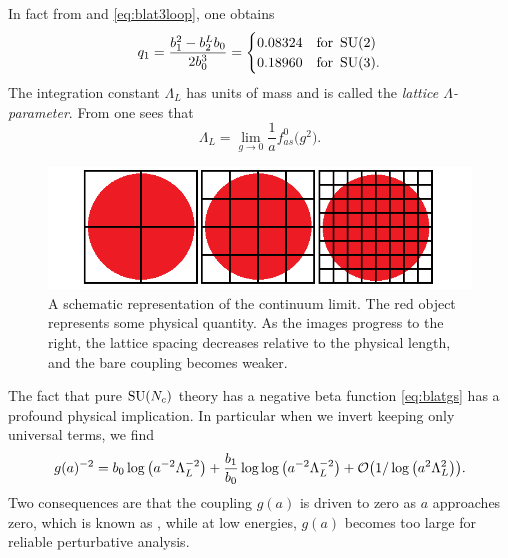In fact from  and \eqref{eq:blat3loop}, one obtains
\begin{equation}\label{eq:q1value}
  q_1=\frac{b_{1}^{2}-b_{2}^{L}b_{0}}{2b_{0}^{3}}=
  \begin{cases}
     0.08324 & \text{for}\ \operatorname{SU}(2) \\
     0.18960 & \text{for}\ \operatorname{SU}(3).
  \end{cases}
\end{equation}
The integration constant $\Lambda_{L}$ has units of mass and is called the
{\it lattice $\Lambda$-parameter}.
From  one sees that
\begin{equation}\label{eq:llat}
  \Lambda_L=\lim_{g\to0}\frac{1}{a}f_{as}^0\big(g^2\big).
\end{equation}

\begin{figure}
  \centering
  \includegraphics[width=0.9\linewidth]{figs/continuumlimit.png}
  \caption{A schematic representation of the continuum limit. The
           red object represents some physical quantity. As the
           images progress to the right, the lattice spacing decreases
           relative to the physical length, and the bare coupling
           becomes weaker.}
  \label{fig:climit}
\end{figure}

The fact that pure $\operatorname{SU}(N_c)$ theory has a negative beta function
\eqref{eq:blatgs} has a profound physical implication. In particular 
when we invert  keeping only universal
terms, we find
\begin{equation}\label{eq:rgesoln}
  g(a)^{-2}=b_0\log\left(a^{-2}\Lambda_L^{-2}\right) 
            +\frac{b_1}{b_0}\log\log\left(a^{-2}\Lambda_L^{-2}\right)
            +\order{1/\log\left(a^2\Lambda_L^2\right)}.
\end{equation}
Two consequences are that the coupling $g(a)$ is driven to zero
as $a$ approaches zero, which is known as 
, while at low energies,
$g(a)$ becomes too large for reliable perturbative analysis.

